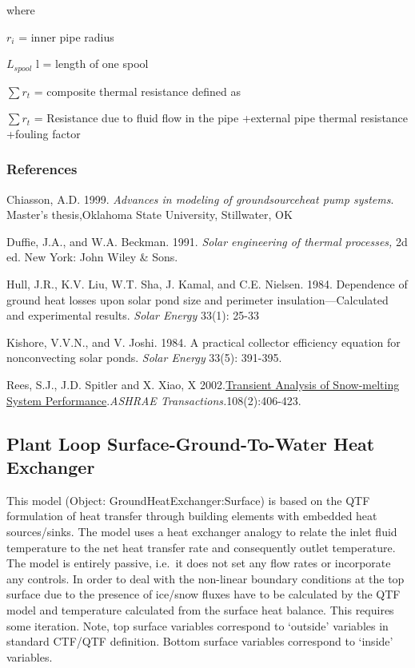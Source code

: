 where

\({r_i}\) = inner pipe radius

\({L_{spool}}\) l = length of one spool

\(\sum {{r_t}}\) = composite thermal resistance defined as

\(\sum {{r_t}}\) = Resistance due to fluid flow in the pipe +external pipe thermal resistance +fouling factor

\subsubsection{References}\label{references-4-002}

Chiasson, A.D. 1999. \emph{Advances in modeling of groundsourceheat pump systems}. Master's thesis,Oklahoma State University, Stillwater, OK

Duffie, J.A., and W.A. Beckman. 1991. \emph{Solar engineering of thermal processes,} 2d ed. New York: John Wiley \& Sons.

Hull, J.R., K.V. Liu, W.T. Sha, J. Kamal, and C.E. Nielsen. 1984. Dependence of ground heat losses upon solar pond size and perimeter insulation---Calculated and experimental results. \emph{Solar Energy} 33(1): 25-33

Kishore, V.V.N., and V. Joshi. 1984. A practical collector efficiency equation for nonconvecting solar ponds. \emph{Solar Energy} 33(5): 391-395.

Rees, S.J., J.D. Spitler and X. Xiao, X 2002.\href{http://www.hvac.okstate.edu/pdfs/Rees_Spitler_Xiao_02.pdf}{Transient Analysis of Snow-melting System Performance}.\emph{ASHRAE Transactions.}108(2):406-423.

\subsection{Plant Loop Surface-Ground-To-Water Heat Exchanger}\label{plant-loop-surface-ground-to-water-heat-exchanger}

This model (Object: GroundHeatExchanger:Surface) is based on the QTF formulation of heat transfer through building elements with embedded heat sources/sinks. The model uses a heat exchanger analogy to relate the inlet fluid temperature to the net heat transfer rate and consequently outlet temperature. The model is entirely passive, i.e.~it does not set any flow rates or incorporate any controls. In order to deal with the non-linear boundary conditions at the top surface due to the presence of ice/snow fluxes have to be calculated by the QTF model and temperature calculated from the surface heat balance. This requires some iteration. Note, top surface variables correspond to `outside' variables in standard CTF/QTF definition. Bottom surface variables correspond to `inside' variables.

